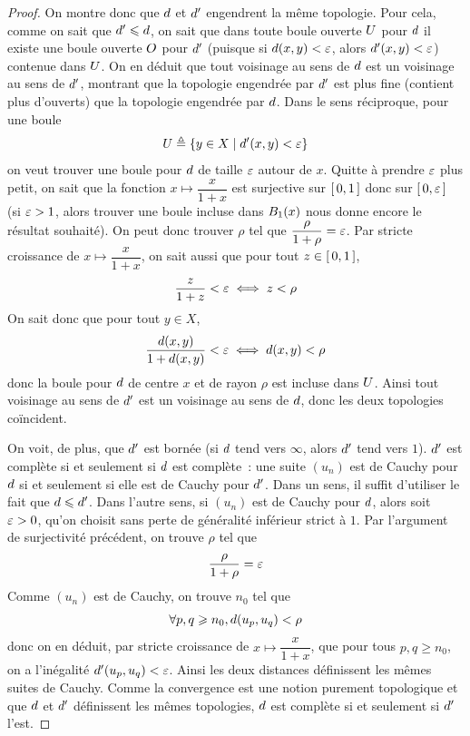 \begin{proof}
  On montre donc que $\vardis$ et $\vardis'$ engendrent la même topologie. Pour
  cela, comme on sait que $\vardis' \leq \vardis$, on sait que dans toute boule
  ouverte $\varOp$ pour $\vardis$ il existe une boule ouverte $\varOpB$ pour
  $\vardis'$ (puisque si $\vardis(x,y) < \vareps$, alors
  $\vardis'(x,y) < \vareps$) contenue dans $\varOp$. On en déduit que tout
  voisinage au sens de $\vardis$ est un voisinage au sens de $\vardis'$,
  montrant que la topologie engendrée par $\vardis'$ est plus fine (contient
  plus d'ouverts) que la topologie engendrée par $\vardis$. Dans le sens
  réciproque, pour une boule
  \[\varOp \defeq \compr{y \in X}{\vardis'(x,y) < \vareps}\]
  on veut trouver une boule pour $\vardis$ de taille $\vareps$ autour de $x$.
  Quitte à prendre $\vareps$ plus petit, on sait que la fonction
  $x\mapsto \dfrac{x}{1 + x}$ est surjective sur $\intFF{0}{1}$ donc sur
  $\intFF{0}{\vareps}$ (si $\vareps > 1$, alors trouver une boule incluse dans
  $\boule{x}{1}$ nous donne encore le résultat souhaité). On peut donc trouver
  $\rho$ tel que $\dfrac{\rho}{1 + \rho} = \vareps$. Par stricte croissance
  de $x\mapsto \dfrac{x}{1 + x}$, on sait aussi que pour tout
  $z \in \intFF{0}{1}$,
  \[\frac{z}{1 + z} < \vareps \iff z < \rho\]
  On sait donc que pour tout $y \in X$,
  \[\frac{\vardis(x,y)}{1 + \vardis(x,y)}< \vareps \iff \vardis(x,y) < \rho\]
  donc la boule pour $\vardis$ de centre $x$ et de rayon $\rho$ est incluse dans
  $\varOp$. Ainsi tout voisinage au sens de $\vardis'$ est un voisinage au sens
  de $\vardis$, donc les deux topologies coïncident.
  
  On voit, de plus, que $\vardis'$ est bornée (si $\vardis$ tend vers $\infty$,
  alors $\vardis'$ tend vers $1$). $\vardis'$ est complète si et seulement si
  $\vardis$ est complète~: une suite $(u_n)$ est de Cauchy pour $\vardis$ si et
  seulement si elle est de Cauchy pour $\vardis'$. Dans un sens, il suffit
  d'utiliser le fait que $\vardis \leq \vardis'$. Dans l'autre sens, si $(u_n)$
  est de Cauchy pour $\vardis$, alors soit $\vareps > 0$, qu'on choisit sans
  perte de généralité inférieur strict à $1$. Par l'argument de surjectivité
  précédent, on trouve $\rho$ tel que
  \[\frac{\rho}{1 + \rho} = \vareps\]
  Comme $(u_n)$ est de Cauchy, on trouve $n_0$ tel que
  \[\forall p,q \geq n_0, \vardis(u_p,u_q) < \rho\]
  donc on en déduit, par stricte croissance de $x\mapsto \dfrac{x}{1 + x}$,
  que pour tous $p,q \geq n_0$, on a l'inégalité $\vardis'(u_p,u_q) < \vareps$.
  Ainsi les deux distances définissent les mêmes suites de Cauchy. Comme la
  convergence est une notion purement topologique et que $\vardis$ et $\vardis'$
  définissent les mêmes topologies, $\vardis$ est complète si et seulement si
  $\vardis'$ l'est.


\end{proof}
